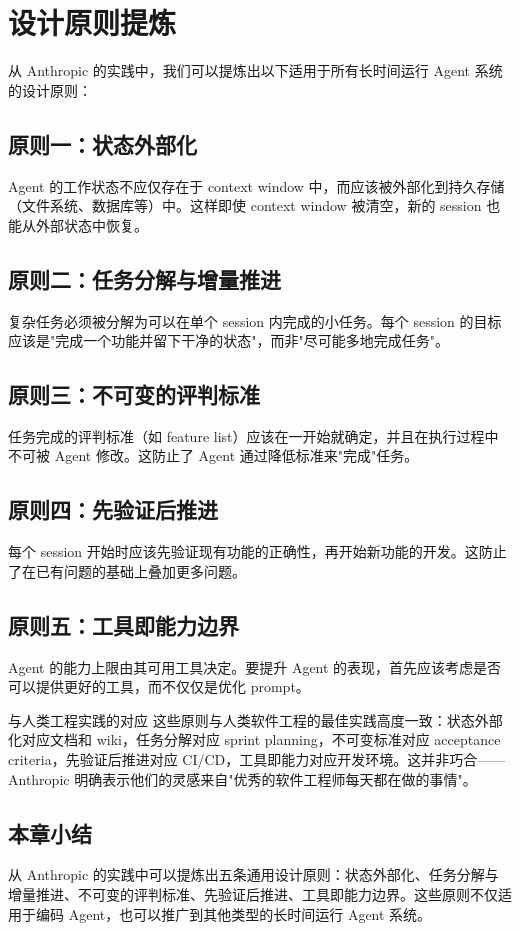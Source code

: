 \section{设计原则提炼}

从 Anthropic 的实践中，我们可以提炼出以下适用于所有长时间运行 Agent 系统的设计原则：

\subsection{原则一：状态外部化}

Agent 的工作状态不应仅存在于 context window 中，而应该被外部化到持久存储（文件系统、数据库等）中。这样即使 context window 被清空，新的 session 也能从外部状态中恢复。

\subsection{原则二：任务分解与增量推进}

复杂任务必须被分解为可以在单个 session 内完成的小任务。每个 session 的目标应该是"完成一个功能并留下干净的状态"，而非"尽可能多地完成任务"。

\subsection{原则三：不可变的评判标准}

任务完成的评判标准（如 feature list）应该在一开始就确定，并且在执行过程中不可被 Agent 修改。这防止了 Agent 通过降低标准来"完成"任务。

\subsection{原则四：先验证后推进}

每个 session 开始时应该先验证现有功能的正确性，再开始新功能的开发。这防止了在已有问题的基础上叠加更多问题。

\subsection{原则五：工具即能力边界}

Agent 的能力上限由其可用工具决定。要提升 Agent 的表现，首先应该考虑是否可以提供更好的工具，而不仅仅是优化 prompt。

\begin{knowledgebox}{与人类工程实践的对应}
这些原则与人类软件工程的最佳实践高度一致：状态外部化对应文档和 wiki，任务分解对应 sprint planning，不可变标准对应 acceptance criteria，先验证后推进对应 CI/CD，工具即能力对应开发环境。这并非巧合——Anthropic 明确表示他们的灵感来自"优秀的软件工程师每天都在做的事情"。
\end{knowledgebox}

\subsection{本章小结}

从 Anthropic 的实践中可以提炼出五条通用设计原则：状态外部化、任务分解与增量推进、不可变的评判标准、先验证后推进、工具即能力边界。这些原则不仅适用于编码 Agent，也可以推广到其他类型的长时间运行 Agent 系统。


